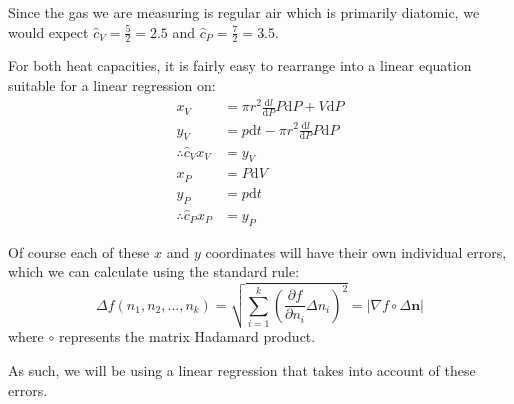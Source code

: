 \documentclass[a4paper]{scrartcl}
\begin{document}
Since the gas we are measuring is regular air which is primarily diatomic, we would expect \(\hat{c}_V = \frac{5}{2} = 2.5\) and \(\hat{c}_P = \frac{7}{2} = 3.5\).

For both heat capacities, it is fairly easy to rearrange into a linear equation suitable for a linear regression on:
\begin{align*}
    x_V &= \pi r^2 \frac{\mathrm{d} l}{\mathrm{d} P} P \mathrm{d} P + V \mathrm{d} P \\
    y_V &= p \mathrm{d} t - \pi r^2 \frac{\mathrm{d} l}{\mathrm{d} P} P \mathrm{d} P \\
    \therefore \hat{c}_V x_V &= y_V \\
    x_P &= P \mathrm{d} V \\
    y_P &= p \mathrm{d} t \\
    \therefore \hat{c}_P x_P &= y_P
\end{align*}

Of course each of these \(x\) and \(y\) coordinates will have their own individual errors, which we can calculate using the standard rule:
\[\Delta f(n_1, n_2, ..., n_k) = \sqrt{\sum_{i = 1}^k \left(\frac{\partial f}{\partial n_i} \Delta n_i\right)^2} = |\nabla f \circ \Delta \mathbf{n}|\]
where \(\circ\) represents the matrix Hadamard product.

As such, we will be using a linear regression that takes into account of these errors\cite{linear-regression}.
\end{document}
